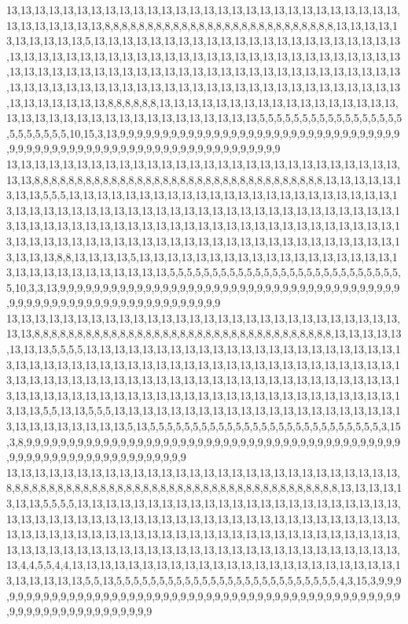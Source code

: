 13,13,13,13,13,13,13,13,13,13,13,13,13,13,13,13,13,13,13,13,13,13,13,13,13,13,13,13,13,13,13,13,13,13,13,8,8,8,8,8,8,8,8,8,8,8,8,8,8,8,8,8,8,8,8,8,8,8,8,8,8,8,13,13,13,13,13,13,13,13,13,13,5,13,13,13,13,13,13,13,13,13,13,13,13,13,13,13,13,13,13,13,13,13,13,13,13,13,13,13,13,13,13,13,13,13,13,13,13,13,13,13,13,13,13,13,13,13,13,13,13,13,13,13,13,13,13,13,13,13,13,13,13,13,13,13,13,13,13,13,13,13,13,13,13,13,13,13,13,13,13,13,13,13,13,13,13,13,13,13,13,13,13,13,13,13,13,13,13,13,13,13,13,13,13,13,13,13,13,13,13,13,13,13,13,13,8,8,8,8,8,8,13,13,13,13,13,13,13,13,13,13,13,13,13,13,13,13,13,13,13,13,13,13,13,13,13,13,13,13,13,13,13,13,13,13,13,5,5,5,5,5,5,5,5,5,5,5,5,5,5,5,5,5,5,5,5,5,5,5,5,10,15,3,13,9,9,9,9,9,9,9,9,9,9,9,9,9,9,9,9,9,9,9,9,9,9,9,9,9,9,9,9,9,9,9,9,9,9,9,9,9,9,9,9,9,9,9,9,9,9,9,9,9,9,9,9,9,9,9,9,9,9,9,9,9,9,9,9,9
13,13,13,13,13,13,13,13,13,13,13,13,13,13,13,13,13,13,13,13,13,13,13,13,13,13,13,13,13,13,8,8,8,8,8,8,8,8,8,8,8,8,8,8,8,8,8,8,8,8,8,8,8,8,8,8,8,8,8,8,8,8,8,8,13,13,13,13,13,13,13,13,5,5,5,13,13,13,13,13,13,13,13,13,13,13,13,13,13,13,13,13,13,13,13,13,13,13,13,13,13,13,13,13,13,13,13,13,13,13,13,13,13,13,13,13,13,13,13,13,13,13,13,13,13,13,13,13,13,13,13,13,13,13,13,13,13,13,13,13,13,13,13,13,13,13,13,13,13,13,13,13,13,13,13,13,13,13,13,13,13,13,13,13,13,13,13,13,13,13,13,13,13,13,13,13,13,13,13,13,13,13,13,13,13,13,8,8,13,13,13,13,5,13,13,13,13,13,13,13,13,13,13,13,13,13,13,13,13,13,13,13,13,13,13,13,13,13,13,13,13,13,13,5,5,5,5,5,5,5,5,5,5,5,5,5,5,5,5,5,5,5,5,5,5,5,5,5,5,5,5,10,3,3,13,9,9,9,9,9,9,9,9,9,9,9,9,9,9,9,9,9,9,9,9,9,9,9,9,9,9,9,9,9,9,9,9,9,9,9,9,9,9,9,9,9,9,9,9,9,9,9,9,9,9,9,9,9,9,9,9,9,9,9,9,9,9,9,9,9
13,13,13,13,13,13,13,13,13,13,13,13,13,13,13,13,13,13,13,13,13,13,13,13,13,13,13,13,13,13,8,8,8,8,8,8,8,8,8,8,8,8,8,8,8,8,8,8,8,8,8,8,8,8,8,8,8,8,8,8,8,8,8,8,8,13,13,13,13,13,13,13,13,5,5,5,5,13,13,13,13,13,13,13,13,13,13,13,13,13,13,13,13,13,13,13,13,13,13,13,13,13,13,13,13,13,13,13,13,13,13,13,13,13,13,13,13,13,13,13,13,13,13,13,13,13,13,13,13,13,13,13,13,13,13,13,13,13,13,13,13,13,13,13,13,13,13,13,13,13,13,13,13,13,13,13,13,13,13,13,13,13,13,13,13,13,13,13,13,13,13,13,13,13,13,13,13,13,13,13,13,13,13,13,13,13,5,5,13,13,5,5,5,13,13,13,13,13,13,13,13,13,13,13,13,13,13,13,13,13,13,13,13,13,13,13,13,13,13,13,13,13,5,13,5,5,5,5,5,5,5,5,5,5,5,5,5,5,5,5,5,5,5,5,5,5,5,5,5,5,5,3,15,3,8,9,9,9,9,9,9,9,9,9,9,9,9,9,9,9,9,9,9,9,9,9,9,9,9,9,9,9,9,9,9,9,9,9,9,9,9,9,9,9,9,9,9,9,9,9,9,9,9,9,9,9,9,9,9,9,9,9,9,9,9,9,9,9,9,9
13,13,13,13,13,13,13,13,13,13,13,13,13,13,13,13,13,13,13,13,13,13,13,13,13,13,13,13,8,8,8,8,8,8,8,8,8,8,8,8,8,8,8,8,8,8,8,8,8,8,8,8,8,8,8,8,8,8,8,8,8,8,8,8,8,8,8,13,13,13,13,13,13,13,5,5,5,5,13,13,13,13,13,13,13,13,13,13,13,13,13,13,13,13,13,13,13,13,13,13,13,13,13,13,13,13,13,13,13,13,13,13,13,13,13,13,13,13,13,13,13,13,13,13,13,13,13,13,13,13,13,13,13,13,13,13,13,13,13,13,13,13,13,13,13,13,13,13,13,13,13,13,13,13,13,13,13,13,13,13,13,13,13,13,13,13,13,13,13,13,13,13,13,13,13,13,13,13,13,13,13,13,13,13,13,13,4,4,5,5,4,4,13,13,13,13,13,13,13,13,13,13,13,13,13,13,13,13,13,13,13,13,13,13,13,13,13,13,13,13,13,5,5,13,5,5,5,5,5,5,5,5,5,5,5,5,5,5,5,5,5,5,5,5,5,5,5,5,5,5,4,3,15,3,9,9,9,9,9,9,9,9,9,9,9,9,9,9,9,9,9,9,9,9,9,9,9,9,9,9,9,9,9,9,9,9,9,9,9,9,9,9,9,9,9,9,9,9,9,9,9,9,9,9,9,9,9,9,9,9,9,9,9,9,9,9,9,9,9,9
